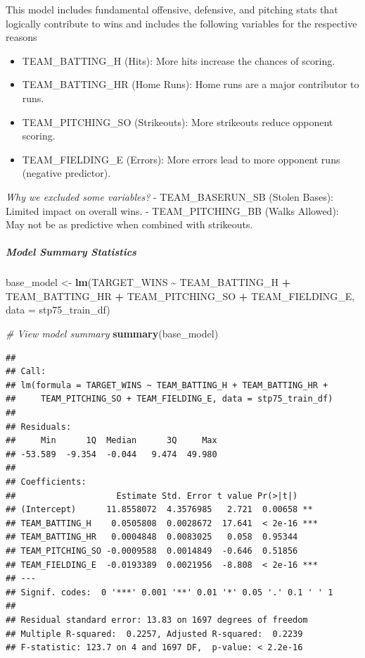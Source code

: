 \documentclass[
]{article}
\newenvironment{Shaded}{\begin{snugshade}}{\end{snugshade}}
\newcommand{\AttributeTok}[1]{\textcolor[rgb]{0.13,0.29,0.53}{#1}}
\newcommand{\CommentTok}[1]{\textcolor[rgb]{0.56,0.35,0.01}{\textit{#1}}}
\newcommand{\FunctionTok}[1]{\textcolor[rgb]{0.13,0.29,0.53}{\textbf{#1}}}
\newcommand{\NormalTok}[1]{#1}
\newcommand{\OtherTok}[1]{\textcolor[rgb]{0.56,0.35,0.01}{#1}}
\newcommand{\SpecialCharTok}[1]{\textcolor[rgb]{0.81,0.36,0.00}{\textbf{#1}}}
\providecommand{\tightlist}{%
  \setlength{\itemsep}{0pt}\setlength{\parskip}{0pt}}
\begin{document}
This model includes fundamental offensive, defensive, and pitching stats
that logically contribute to wins and includes the following variables
for the respective reasons

\begin{itemize}
\tightlist
\item
  TEAM\_BATTING\_H (Hits): More hits increase the chances of scoring.
\item
  TEAM\_BATTING\_HR (Home Runs): Home runs are a major contributor to
  runs.
\item
  TEAM\_PITCHING\_SO (Strikeouts): More strikeouts reduce opponent
  scoring.
\item
  TEAM\_FIELDING\_E (Errors): More errors lead to more opponent runs
  (negative predictor).
\end{itemize}

\emph{Why we excluded some variables?} - TEAM\_BASERUN\_SB (Stolen
Bases): Limited impact on overall wins. - TEAM\_PITCHING\_BB (Walks
Allowed): May not be as predictive when combined with strikeouts.

\subparagraph{Model Summary Statistics}\label{model-summary-statistics}

\begin{Shaded}
\begin{Highlighting}[]
\NormalTok{base\_model }\OtherTok{\textless{}{-}} \FunctionTok{lm}\NormalTok{(TARGET\_WINS }\SpecialCharTok{\textasciitilde{}}\NormalTok{ TEAM\_BATTING\_H }\SpecialCharTok{+}\NormalTok{ TEAM\_BATTING\_HR }\SpecialCharTok{+}\NormalTok{ TEAM\_PITCHING\_SO }\SpecialCharTok{+}\NormalTok{ TEAM\_FIELDING\_E, }\AttributeTok{data =}\NormalTok{ stp75\_train\_df)}

\CommentTok{\# View model summary}
\FunctionTok{summary}\NormalTok{(base\_model)}
\end{Highlighting}
\end{Shaded}

\begin{verbatim}
## 
## Call:
## lm(formula = TARGET_WINS ~ TEAM_BATTING_H + TEAM_BATTING_HR + 
##     TEAM_PITCHING_SO + TEAM_FIELDING_E, data = stp75_train_df)
## 
## Residuals:
##     Min      1Q  Median      3Q     Max 
## -53.589  -9.354  -0.044   9.474  49.980 
## 
## Coefficients:
##                    Estimate Std. Error t value Pr(>|t|)    
## (Intercept)      11.8558072  4.3576985   2.721  0.00658 ** 
## TEAM_BATTING_H    0.0505808  0.0028672  17.641  < 2e-16 ***
## TEAM_BATTING_HR   0.0004848  0.0083025   0.058  0.95344    
## TEAM_PITCHING_SO -0.0009588  0.0014849  -0.646  0.51856    
## TEAM_FIELDING_E  -0.0193389  0.0021956  -8.808  < 2e-16 ***
## ---
## Signif. codes:  0 '***' 0.001 '**' 0.01 '*' 0.05 '.' 0.1 ' ' 1
## 
## Residual standard error: 13.83 on 1697 degrees of freedom
## Multiple R-squared:  0.2257, Adjusted R-squared:  0.2239 
## F-statistic: 123.7 on 4 and 1697 DF,  p-value: < 2.2e-16
\end{verbatim}
\end{document}
